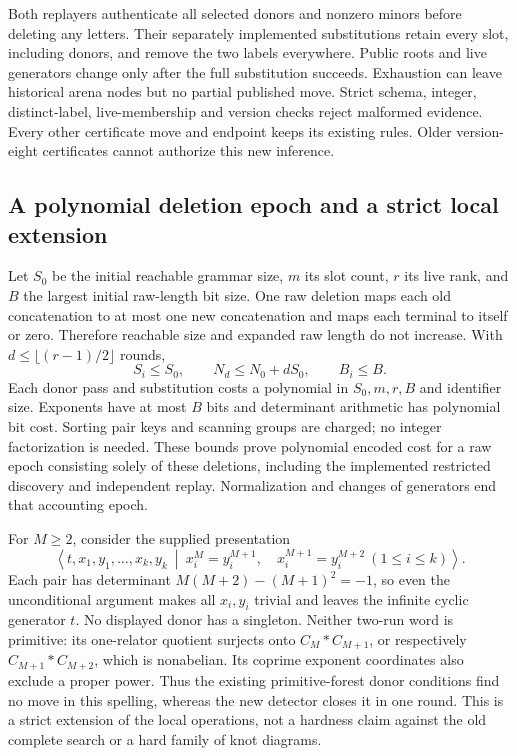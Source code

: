 Both replayers authenticate all selected donors and nonzero minors before
deleting any letters. Their separately implemented substitutions retain every
slot, including donors, and remove the two labels everywhere. Public roots and
live generators change only after the full substitution succeeds. Exhaustion
can leave historical arena nodes but no partial published move. Strict schema,
integer, distinct-label, live-membership and version checks reject malformed
evidence. Every other certificate move and endpoint keeps its existing rules.
Older version-eight certificates cannot authorize this new inference.

\subsection{A polynomial deletion epoch and a strict local extension}

Let $S_0$ be the initial reachable grammar size, $m$ its slot count, $r$ its
live rank, and $B$ the largest initial raw-length bit size. One raw deletion
maps each old concatenation to at most one new concatenation and maps each
terminal to itself or zero. Therefore reachable size and expanded raw length
do not increase. With $d\le\lfloor(r-1)/2\rfloor$ rounds,
\[
 S_i\le S_0,\qquad N_d\le N_0+dS_0,
 \qquad B_i\le B.
\]
Each donor pass and substitution costs a polynomial in $S_0,m,r,B$ and
identifier size. Exponents have at most $B$ bits and determinant arithmetic
has polynomial bit cost. Sorting pair keys and scanning groups are charged;
no integer factorization is needed. These bounds prove polynomial encoded
cost for a raw epoch consisting solely of these deletions, including the
implemented restricted discovery and independent replay. Normalization and
changes of generators end that accounting epoch.

For $M\ge2$, consider the supplied presentation
\[
 \left\langle t,x_1,y_1,\ldots,x_k,y_k\ \middle|\
 x_i^M=y_i^{M+1},\quad x_i^{M+1}=y_i^{M+2}\ (1\le i\le k)
 \right\rangle.
\]
Each pair has determinant $M(M+2)-(M+1)^2=-1$, so even the unconditional
argument makes all $x_i,y_i$ trivial and leaves the infinite cyclic generator
$t$. No displayed donor has a singleton. Neither two-run word is primitive:
its one-relator quotient surjects onto $C_M*C_{M+1}$, or respectively
$C_{M+1}*C_{M+2}$, which is nonabelian. Its coprime exponent coordinates also
exclude a proper power. Thus the existing primitive-forest donor conditions
find no move in this spelling, whereas the new detector closes it in one
round. This is a strict extension of the local operations, not a hardness
claim against the old complete search or a hard family of knot diagrams.

